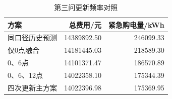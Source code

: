\begin{table}[htbp]\centering\small
\caption{第三问更新频率对照}
\begin{tabular}{lrr}\toprule
方案 & 总费用/元 & 紧急购电量/kWh\\\midrule
同口径历史预测 & 14389892.50 & 246099.33\\
仅0点融合 & 14181445.03 & 218589.30\\
0、6点 & 14101371.47 & 186570.89\\
0、6、12点 & 14022358.10 & 175344.39\\
四次更新主方案 & 14022396.98 & 175369.95\\
\bottomrule\end{tabular}\end{table}
